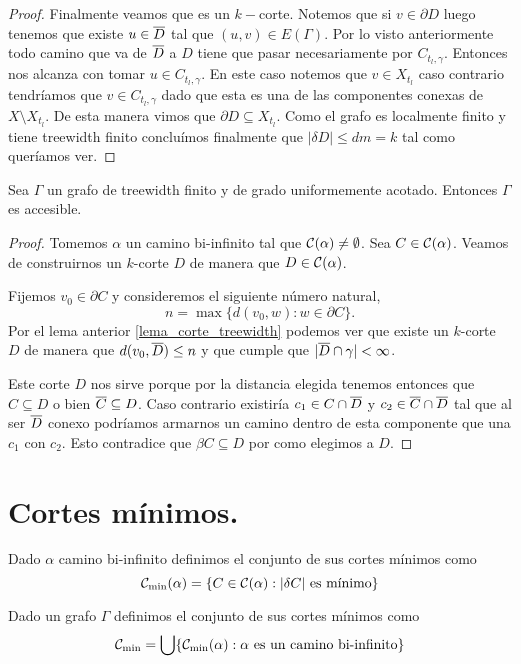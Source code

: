 \documentclass[tesis.tex]{subfiles}
\begin{document}
\begin{proof}
	Finalmente veamos que es un $k-$corte.
	Notemos que si $v \in \partial D$ luego tenemos que existe $u \in \overline D$ tal que $(u,v) \in E(\Gamma)$.
	Por lo visto anteriormente todo camino que va de $\overline D$ a $D$ tiene que pasar necesariamente por $C_{t_l, \gamma}$. 
	Entonces nos alcanza con tomar $u \in C_{t_l, \gamma}$.
	En este caso notemos que $v \in X_{t_l}$ caso contrario tendríamos que $v \in C_{t_l, \gamma}$ dado que esta es una de las componentes conexas de $X \setminus X_{t_l}$.
	De esta manera vimos que $\partial D \subseteq X_{t_l}$.
	Como el grafo es localmente finito y tiene treewidth finito concluímos finalmente que $|\delta D| \le dm = k$ tal como queríamos ver.
		
\end{proof}


\begin{teo}\label{teo_treewidth_fin_accesible}
	Sea $\Gamma$ un grafo de treewidth finito y de grado uniformemente acotado.
	Entonces $\Gamma$ es accesible.
\end{teo}
\begin{proof}
	Tomemos $\alpha$ un camino bi-infinito tal que ${\cal C}(\alpha) \neq \emptyset$.
	Sea $C \in {\cal C}(\alpha)$.
	Veamos de construirnos un $k$-corte $D$ de manera que $D \in {\cal C}(\alpha)$.
	
	Fijemos $v_0  \in \partial C$ y consideremos el siguiente número natural,
	\[
		n = \max \{ d(v_0,w) : w \in \partial C  \}.
	\]
	Por el lema anterior \ref{lema_corte_treewidth} podemos ver que existe un $k$-corte $D$ de manera que $d(v_0, \overline D) \le n$ y que cumple que $|\overline D \cap \gamma| < \infty$.
	
	Este corte $D$ nos sirve porque por la distancia elegida tenemos entonces que $C \subseteq D$ o bien $\overline C \subseteq D$.
	Caso contrario existiría $c_1 \in C \cap \overline D$ y $c_2 \in \overline C \cap \overline D$ tal que al ser $\overline D$ conexo podríamos armarnos un camino dentro de esta componente que una $c_1$ con $c_2$.
	Esto contradice que $\beta C \subseteq D$ por como elegimos a $D$.	
\end{proof}


\section{Cortes mínimos.}

\begin{deff}
	Dado $\alpha$ camino bi-infinito definimos el conjunto de sus cortes mínimos como
	\[
		\cam = \{  C \in \ca : |\delta C| \ \text{es mínimo}  \}
	\]
	
	Dado un grafo $\Gamma$ definimos el conjunto de sus cortes mínimos como 
	\[
		{\cal C}_{\text{min}} = \bigcup \{ {\cal C}_{\text{min}}(\alpha) : \alpha \ \text{es un camino bi-infinito}  \}
	\]
\end{deff}
\end{document}
